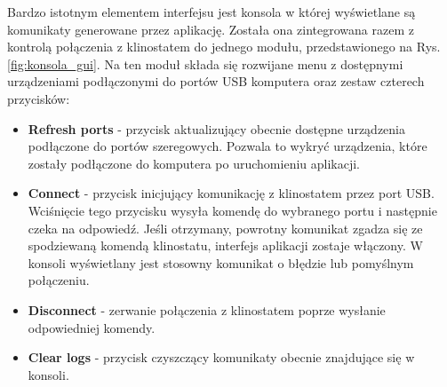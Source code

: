 Bardzo istotnym elementem interfejsu jest konsola w której wyświetlane są komunikaty generowane przez aplikację. Została ona zintegrowana razem z kontrolą połączenia z klinostatem do jednego modułu, przedstawionego na Rys. \ref{fig:konsola_gui}. Na ten moduł składa się rozwijane menu z dostępnymi urządzeniami podłączonymi do portów USB komputera oraz zestaw czterech przycisków:
\begin{itemize}
	\item \textbf{Refresh ports} - przycisk aktualizujący obecnie dostępne urządzenia podłączone do portów szeregowych. Pozwala to wykryć urządzenia, które zostały podłączone do komputera po uruchomieniu aplikacji.
	\item \textbf{Connect} - przycisk inicjujący komunikację z klinostatem przez port USB. Wciśnięcie tego przycisku wysyła komendę do wybranego portu i następnie czeka na odpowiedź. Jeśli otrzymany, powrotny komunikat zgadza się ze spodziewaną komendą klinostatu, interfejs aplikacji zostaje włączony. W konsoli wyświetlany jest stosowny komunikat o błędzie lub pomyślnym połączeniu.
	\item \textbf{Disconnect} - zerwanie połączenia z klinostatem poprze wysłanie odpowiedniej komendy.
	\item \textbf{Clear logs} - przycisk czyszczący komunikaty obecnie znajdujące się w konsoli.
	
\end{itemize}

